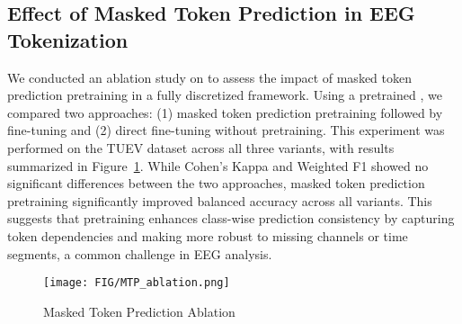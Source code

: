 


\subsection{Effect of Masked Token Prediction in EEG Tokenization}
\label{app:masked_token_prediction_ablation}
% 

We conducted an ablation study on \encoder to assess the impact of masked token prediction pretraining in a fully discretized framework. Using a pretrained \tokenizer, we compared two approaches: (1) masked token prediction pretraining followed by fine-tuning and (2) direct fine-tuning without pretraining. This experiment was performed on the TUEV dataset across all three \tokenizer variants, with results summarized in Figure~\ref{fig:MTP_ablation}. While Cohen's Kappa and Weighted F1 showed no significant differences between the two approaches, masked token prediction pretraining significantly improved balanced accuracy across all \tokenizer variants. This suggests that pretraining enhances class-wise prediction consistency by capturing token dependencies and making \encoder more robust to missing channels or time segments, a common challenge in EEG analysis.
 
\begin{figure}[h]
    \centering
    \texttt{[image: FIG/MTP\_ablation.png]}
    \caption{Masked Token Prediction Ablation}
    \label{fig:MTP_ablation}
\end{figure}


